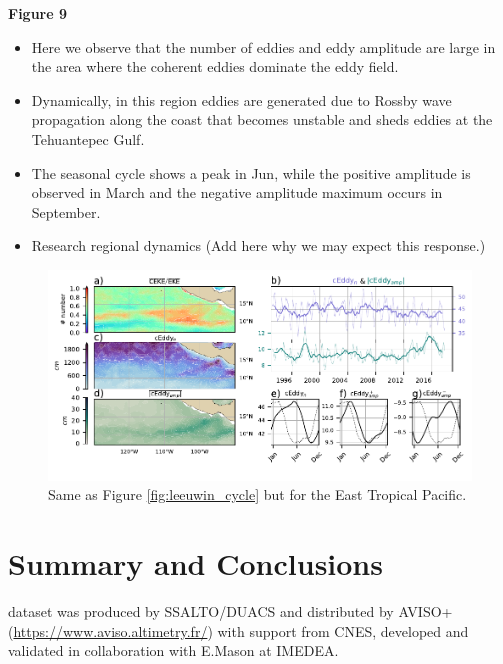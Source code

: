 \documentclass[draft,linenumbers]{agujournal2019}
\begin{document}
	\textbf{Figure 9}
	\begin{itemize}
		\item Here we observe that the number of eddies and eddy amplitude are large in the area where the coherent eddies dominate the eddy field.
		\item Dynamically, in this region eddies are generated due to Rossby wave propagation along the coast that becomes unstable and sheds eddies at the Tehuantepec Gulf.
		\item The seasonal cycle shows a peak in Jun, while the positive amplitude is observed in March and the negative amplitude maximum occurs in September. 
		\item Research regional dynamics (Add here why we may expect this response.)
	\end{itemize}

	\begin{figure}
	    \centering
	    \includegraphics[width=1\textwidth]{figures/regional_ratios_and_stats_V3_3.pdf}
	    \caption{Same as Figure \ref{fig:leeuwin_cycle} but for the East Tropical Pacific.}
	    \label{fig:south_atlantic_cycle}
	\end{figure}
	
	\section{Summary and Conclusions}	
	\label{sec:Conclusions}
	
	\acknowledgments
	\citet{Chelton_mesoscale_2013} dataset was produced by SSALTO/DUACS and distributed by AVISO+ (\url{https://www.aviso.altimetry.fr/}) with support from CNES, developed and validated in collaboration with E.Mason at IMEDEA.
	
	
	
\end{document}

